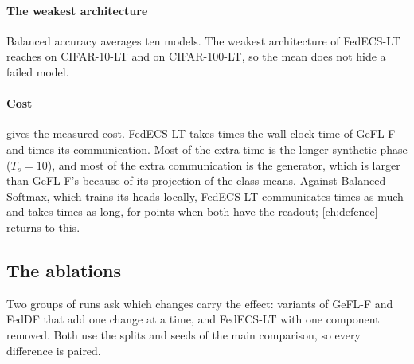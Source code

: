 \paragraph{The weakest architecture} Balanced accuracy averages ten models. The weakest architecture of FedECS-LT
reaches  on CIFAR-10-LT and  on
CIFAR-100-LT, so the mean does not hide a failed model.

\begin{table}[t]
\centering\small
\caption{Cost on CIFAR-10-LT, from the paper's cost table: communication per client over the whole training, wall-clock
time of a run (on a shared T4 GPU, so indicative only), forward MFLOPs per image and training GFLOPs per round. Compare
the first row with Balanced Softmax.}
\label{tab:s-cost}
\end{table}

\paragraph{Cost}  gives the measured cost. FedECS-LT takes  times the
wall-clock time of GeFL-F and  times its communication. Most of the extra time is the longer
synthetic phase ($T_s=10$), and most of the extra communication is the generator, which is larger than GeFL-F's
because of its projection of the class means. Against Balanced Softmax, which trains its heads locally, FedECS-LT
communicates  times as much and takes  times as long,
for  points when both have the readout; \cref{ch:defence} returns to this.

\subsection{The ablations}\label{sec:s-ablations}

Two groups of runs ask which changes carry the effect: variants of GeFL-F and FedDF that add one change at a time,
and FedECS-LT with one component removed. Both use the splits and seeds of the main comparison, so every difference is
paired.

